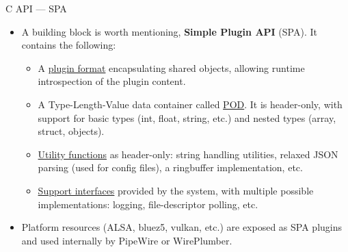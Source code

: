 \begin{frame}[fragile]{C API — SPA}
  \begin{itemize}

  \item A building block is worth mentioning, \textbf{Simple Plugin
    API} (SPA). It contains the following:

    \begin{itemize}
    \item A \href{https://docs.pipewire.org/page_spa.html#autotoc_md225}{plugin format}
      encapsulating shared objects, allowing
      runtime introspection of the plugin content.
    \item A Type-Length-Value data container called
      \href{https://docs.pipewire.org/page_spa_pod.html}{POD}. It is
      header-only, with support for basic types (int, float,
      string, etc.) and nested types (array, struct, objects).
    \item \href{https://docs.pipewire.org/group__spa__utils.html}{Utility functions}
      as header-only: string handling utilities,
      relaxed JSON parsing (used for config files), a ringbuffer
      implementation, etc.
    \item \href{https://docs.pipewire.org/group__spa__support.html}{Support interfaces}
      provided by the system, with multiple
      possible implementations: logging, file-descriptor polling, etc.
    \end{itemize}

  \item Platform resources (ALSA, bluez5, vulkan, etc.) are exposed
    as SPA plugins and used internally by PipeWire or WirePlumber.

  \end{itemize}
\end{frame}



